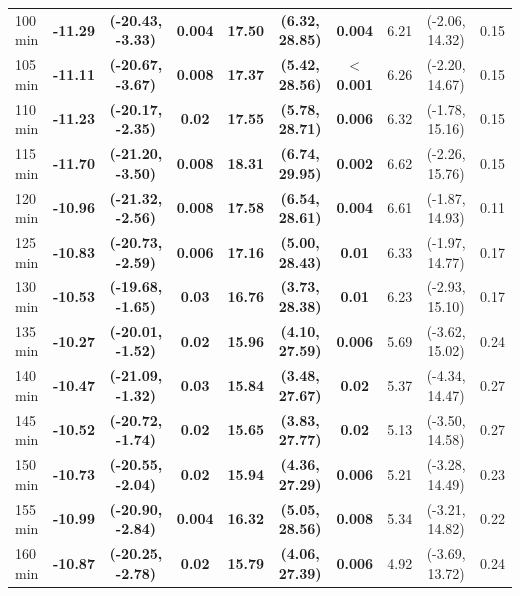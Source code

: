\begin{table}[ht]
{\begin{tabular}{lccccccccc}
100 min & \textbf{-11.29} & \textbf{(-20.43, -3.33)} & \textbf{0.004} & \textbf{17.50} & \textbf{(6.32, 28.85)} & \textbf{0.004} & 6.21 & (-2.06, 14.32) & 0.15 \\
105 min & \textbf{-11.11} & \textbf{(-20.67, -3.67)} & \textbf{0.008} & \textbf{17.37} & \textbf{(5.42, 28.56)} & \textbf{$<$0.001} & 6.26 & (-2.20, 14.67) & 0.15 \\
110 min & \textbf{-11.23} & \textbf{(-20.17, -2.35)} & \textbf{0.02} & \textbf{17.55} & \textbf{(5.78, 28.71)} & \textbf{0.006} & 6.32 & (-1.78, 15.16) & 0.15 \\
115 min & \textbf{-11.70} & \textbf{(-21.20, -3.50)} & \textbf{0.008} & \textbf{18.31} & \textbf{(6.74, 29.95)} & \textbf{0.002} & 6.62 & (-2.26, 15.76) & 0.15 \\
120 min & \textbf{-10.96} & \textbf{(-21.32, -2.56)} & \textbf{0.008} & \textbf{17.58} & \textbf{(6.54, 28.61)} & \textbf{0.004} & 6.61 & (-1.87, 14.93) & 0.11 \\
125 min & \textbf{-10.83} & \textbf{(-20.73, -2.59)} & \textbf{0.006} & \textbf{17.16} & \textbf{(5.00, 28.43)} & \textbf{0.01} & 6.33 & (-1.97, 14.77) & 0.17 \\
130 min & \textbf{-10.53} & \textbf{(-19.68, -1.65)} & \textbf{0.03} & \textbf{16.76} & \textbf{(3.73, 28.38)} & \textbf{0.01} & 6.23 & (-2.93, 15.10) & 0.17 \\
135 min & \textbf{-10.27} & \textbf{(-20.01, -1.52)} & \textbf{0.02} & \textbf{15.96} & \textbf{(4.10, 27.59)} & \textbf{0.006} & 5.69 & (-3.62, 15.02) & 0.24 \\
140 min & \textbf{-10.47} & \textbf{(-21.09, -1.32)} & \textbf{0.03} & \textbf{15.84} & \textbf{(3.48, 27.67)} & \textbf{0.02} & 5.37 & (-4.34, 14.47) & 0.27 \\
145 min & \textbf{-10.52} & \textbf{(-20.72, -1.74)} & \textbf{0.02} & \textbf{15.65} & \textbf{(3.83, 27.77)} & \textbf{0.02} & 5.13 & (-3.50, 14.58) & 0.27 \\
150 min & \textbf{-10.73} & \textbf{(-20.55, -2.04)} & \textbf{0.02} & \textbf{15.94} & \textbf{(4.36, 27.29)} & \textbf{0.006} & 5.21 & (-3.28, 14.49) & 0.23 \\
155 min & \textbf{-10.99} & \textbf{(-20.90, -2.84)} & \textbf{0.004} & \textbf{16.32} & \textbf{(5.05, 28.56)} & \textbf{0.008} & 5.34 & (-3.21, 14.82) & 0.22 \\
160 min & \textbf{-10.87} & \textbf{(-20.25, -2.78)} & \textbf{0.02} & \textbf{15.79} & \textbf{(4.06, 27.39)} & \textbf{0.006} & 4.92 & (-3.69, 13.72) & 0.24 \\

\end{tabular}}
\end{table}

